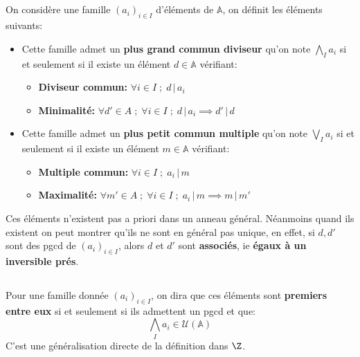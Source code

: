 \subsection*{}
On considère une famille \( (a_i)_{i \in I} \) d'éléments de \( \mathbb{A} \), on définit les éléments suivants:
\begin{itemize}
   \item Cette famille admet un \textbf{plus grand commun diviseur} qu'on note \( \bigwedge_I a_i \)  si et seulement si il existe un élément \( d \in \mathbb{A}\) vérifiant:
   \begin{itemize}
      \item \textbf{Diviseur commun:} \( \forall i \in I \; ; \; d \, | \, a_i \)
      \item \textbf{Minimalité:} \( \forall d' \in A \; ; \; \forall i \in I \; ; \; d \, | \, a_i \implies d' \, | \, d\)
   \end{itemize}
   \item Cette famille admet un \textbf{plus petit commun multiple} qu'on note \( \bigvee_I a_i \) si et seulement si il existe un élément \( m \in \mathbb{A}\) vérifiant:
   \begin{itemize}
      \item \textbf{Multiple commun:} \( \forall i \in I \; ; \; a_i \, | \, m \)
      \item \textbf{Maximalité:} \( \forall m' \in A \; ; \; \forall i \in I \; ; \; a_i \, | \, m \implies m \, | \, m'\)
   \end{itemize}
\end{itemize}
Ces éléments n'existent pas a priori dans un anneau général. Néanmoins quand ils existent on peut montrer qu'ils ne sont en général pas unique, en effet, si \( d, d' \) sont des pgcd de \( (a_i)_{i \in I} \), alors \( d \) et \( d' \) sont \textbf{associés}, ie \textbf{égaux à un inversible prés}.
\subsection*{}
Pour une famille donnée \( (a_i)_{i \in I} \), on dira que ces éléments sont \textbf{premiers entre eux} si et seulement si ils admettent un pgcd et que:
\[ 
   \bigwedge_I a_i \in \mathcal{U}(\mathbb{A}) 
\]
C'est une généralisation directe de la définition dans \( \Z \).
\pagebreak

